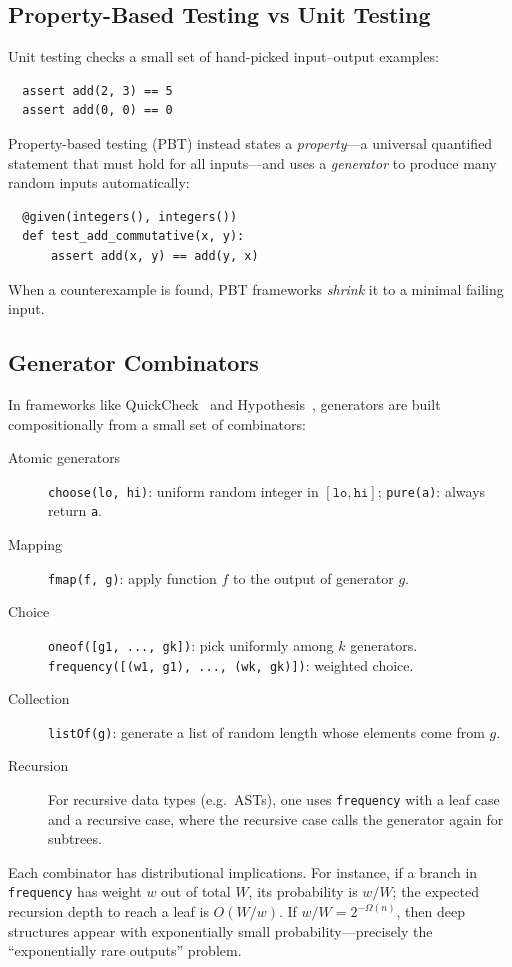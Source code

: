 \documentclass[11pt]{article}
\theoremstyle{remark}
\theoremstyle{definition}
\begin{document}
\subsection{Property-Based Testing vs Unit Testing}

Unit testing checks a small set of hand-picked input--output examples:
\begin{verbatim}
  assert add(2, 3) == 5
  assert add(0, 0) == 0
\end{verbatim}
Property-based testing (PBT) instead states a \emph{property}---a universal
quantified statement that must hold for all inputs---and uses a \emph{generator}
to produce many random inputs automatically:
\begin{verbatim}
  @given(integers(), integers())
  def test_add_commutative(x, y):
      assert add(x, y) == add(y, x)
\end{verbatim}
When a counterexample is found, PBT frameworks \emph{shrink} it to a minimal
failing input.

\subsection{Generator Combinators}

In frameworks like QuickCheck~\cite{claessen2000quickcheck} and
Hypothesis~\cite{MacIver2019}, generators are built compositionally from a small
set of combinators:

\begin{description}
  \item[Atomic generators] \texttt{choose(lo, hi)}: uniform random integer in
    $[\texttt{lo}, \texttt{hi}]$; \texttt{pure(a)}: always return \texttt{a}.
  \item[Mapping] \texttt{fmap(f, g)}: apply function $f$ to the output of
    generator $g$.
  \item[Choice] \texttt{oneof([g1, ..., gk])}: pick uniformly among $k$
    generators. \texttt{frequency([(w1, g1), ..., (wk, gk)])}: weighted choice.
  \item[Collection] \texttt{listOf(g)}: generate a list of random length whose
    elements come from $g$.
  \item[Recursion] For recursive data types (e.g.\ ASTs), one uses
    \texttt{frequency} with a leaf case and a recursive case, where the
    recursive case calls the generator again for subtrees.
\end{description}

Each combinator has distributional implications.  For instance, if a branch in
\texttt{frequency} has weight $w$ out of total $W$, its probability is $w/W$;
the expected recursion depth to reach a leaf is $O(W/w)$.  If $w/W = 2^{-\Omega(n)}$, then deep structures appear with exponentially small
probability---precisely the ``exponentially rare outputs'' problem.
\end{document}
